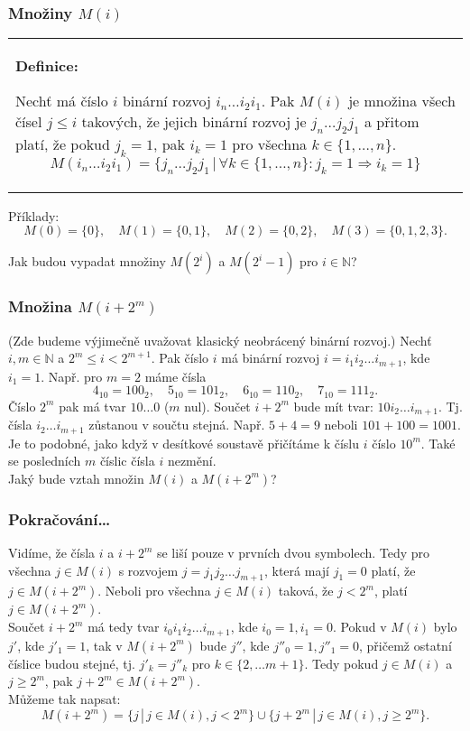 \documentclass{beamer}
\newenvironment{definice}
{
    \begin{center}
    \begin{tabular}{p{9cm}}
    \textbf{Definice:}
}
{
    \end{tabular}
    \end{center}
}
\newcommand{\sep}{\,|\,}
\newcommand{\emptyline}{\\$\,$\\}
\begin{document}
\begin{frame}[t,fragile]\frametitle{Množiny $M(i)$} 
    \begin{definice}
        Nechť má číslo $i$ binární rozvoj $i_{n}\dots i_2i_1$. Pak $M(i)$ je množina všech čísel $j\le i$ takových, že jejich binární rozvoj je $j_{n}\dots j_2j_1$ a přitom platí, že pokud $j_k=1$, pak $i_k=1$ pro všechna $k\in\{1,\dots,n\}$.
        $$
M(i_{n}\dots i_2i_1)=\{j_{n}\dots j_2j_1\sep \forall k \in \{1,\dots,n\}: j_k=1\Rightarrow i_k=1\}
        $$
    \end{definice}

    Příklady: 
    $$
    M(0)=\{0\},\quad M(1) = \{0,1\},\quad M(2)=\{0,2\},\quad M(3)=\{0,1,2,3\}.
    $$

    Jak budou vypadat množiny $M(2^i)$ a $M(2^i-1)$ pro $i\in\mathbb{N}$? 
\end{frame}


\begin{frame}[t,fragile]\frametitle{Množina $M(i+2^m)$} 
(Zde budeme výjimečně uvažovat klasický neobrácený binární rozvoj.) Nechť $i,m\in\mathbb{N}$ a $2^m\le i < 2^{m+1}$. Pak číslo $i$ má binární rozvoj $i=i_1i_2\dots i_{m+1}$, kde $i_1=1$. Např. pro $m=2$ máme čísla 
$$
4_{10}=100_2,\quad 5_{10}=101_2,\quad 6_{10}=110_2,\quad 7_{10}=111_2.
$$
Číslo $2^m$ pak má tvar $10\dots0$ ($m$ nul). Součet $i+2^m$ bude mít tvar: $10i_2\dots i_{m+1}$. Tj. čísla $i_2\dots i_{m+1}$ zůstanou v součtu stejná. Např. $5+4=9$ neboli $101+100=1001$. 
\emptyline
Je to podobné, jako když v desítkové soustavě přičítáme k číslu $i$ číslo $10^m$. Také se posledních $m$ číslic čísla $i$ nezmění. 
\emptyline
Jaký bude vztah množin $M(i)$ a $M(i+2^m)$?
\emptyline

\end{frame}


\begin{frame}[t,fragile]\frametitle{Pokračování\dots} 
Vidíme, že čísla $i$ a $i+2^m$ se liší pouze v prvních dvou symbolech. Tedy pro všechna $j\in M(i)$ s rozvojem $j=j_1j_2\dots j_{m+1}$, která mají $j_1=0$ platí, že $j\in M(i+2^m)$. Neboli pro všechna $j\in M(i)$ taková, že $j<2^m$, platí $j\in M(i+2^m)$.
\emptyline
Součet $i+2^m$ má tedy tvar $i_0i_1i_2\dots i_{m+1}$, kde $i_0=1, i_1=0$. Pokud v $M(i)$ bylo $j'$, kde $j'_1=1$, tak v $M(i+2^m)$ bude $j''$, kde $j''_0=1, j''_1=0$, přičemž ostatní číslice budou stejné, tj. $j'_k=j''_k$ pro $k\in\{2,\dots m+1\}$. Tedy pokud $j\in M(i)$ a $j\ge2^m$, pak $j+2^m\in M(i+2^m)$.
\emptyline
Můžeme tak napsat:
$$
M(i+2^m) = \{j\sep j\in M(i), j < 2^m \} \cup \{j+2^m\sep j\in M(i), j\ge 2^m\}.
$$
\end{frame}
\end{document}
